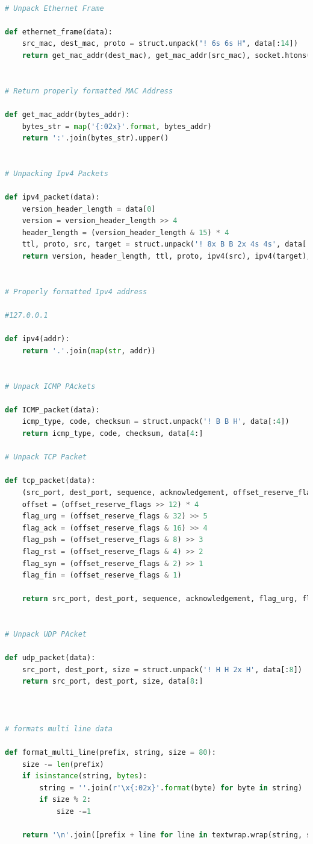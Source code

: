 \documentclass[12pt, a4paper]{report}
\begin{document}
\begin{lstlisting}[language=Python, style=chstyle]

# Unpack Ethernet Frame

def ethernet_frame(data):
    src_mac, dest_mac, proto = struct.unpack("! 6s 6s H", data[:14])
    return get_mac_addr(dest_mac), get_mac_addr(src_mac), socket.htons(proto), data[14:]


# Return properly formatted MAC Address

def get_mac_addr(bytes_addr):
    bytes_str = map('{:02x}'.format, bytes_addr)
    return ':'.join(bytes_str).upper()


# Unpacking Ipv4 Packets

def ipv4_packet(data):
    version_header_length = data[0]
    version = version_header_length >> 4
    header_length = (version_header_length & 15) * 4
    ttl, proto, src, target = struct.unpack('! 8x B B 2x 4s 4s', data[:20])
    return version, header_length, ttl, proto, ipv4(src), ipv4(target), data[header_length:]


# Properly formatted Ipv4 address
    
#127.0.0.1

def ipv4(addr):
    return '.'.join(map(str, addr))


# Unpack ICMP PAckets

def ICMP_packet(data):
    icmp_type, code, checksum = struct.unpack('! B B H', data[:4])
    return icmp_type, code, checksum, data[4:]

# Unpack TCP Packet    

def tcp_packet(data):
    (src_port, dest_port, sequence, acknowledgement, offset_reserve_flags) = struct.unpack('! H H L L H', data[:14])
    offset = (offset_reserve_flags >> 12) * 4
    flag_urg = (offset_reserve_flags & 32) >> 5
    flag_ack = (offset_reserve_flags & 16) >> 4
    flag_psh = (offset_reserve_flags & 8) >> 3
    flag_rst = (offset_reserve_flags & 4) >> 2
    flag_syn = (offset_reserve_flags & 2) >> 1
    flag_fin = (offset_reserve_flags & 1)

    return src_port, dest_port, sequence, acknowledgement, flag_urg, flag_ack, flag_psh, flag_rst, flag_syn, flag_fin, data[offset :]


# Unpack UDP PAcket

def udp_packet(data):
    src_port, dest_port, size = struct.unpack('! H H 2x H', data[:8])
    return src_port, dest_port, size, data[8:]



# formats multi line data

def format_multi_line(prefix, string, size = 80):
    size -= len(prefix)
    if isinstance(string, bytes):
        string = ''.join(r'\x{:02x}'.format(byte) for byte in string)
        if size % 2:
            size -=1

    return '\n'.join([prefix + line for line in textwrap.wrap(string, size)])



\end{lstlisting}
\end{document}
